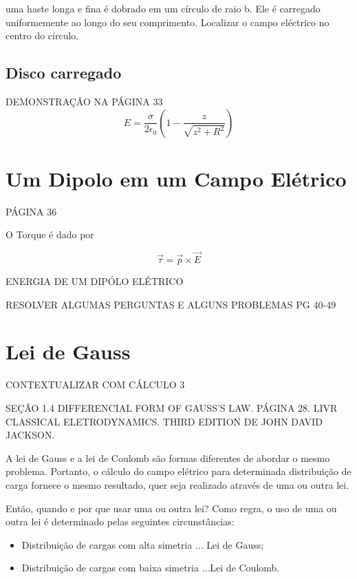 \begin{exe}
uma haste longa e fina é dobrado em um círculo de raio b. Ele é carregado uniformemente ao longo do seu comprimento. Localizar o campo eléctrico no centro do círculo.
\end{exe}

\subsection{Disco carregado}
DEMONSTRAÇÃO NA PÁGINA 33
\begin{equation}\label{18.10}
    E=\dfrac{\sigma}{2\epsilon_0} \left(1-\dfrac{z}{\sqrt{z^2+R^2}}\right)
\end{equation}

\section{Um Dipolo em um Campo Elétrico}
PÁGINA 36

O Torque é dado por

\begin{equation}\label{18.11}
    \vec{\tau}=\vec{p}\times \vec{E}
\end{equation}

ENERGIA DE UM DIPÓLO ELÉTRICO

RESOLVER ALGUMAS PERGUNTAS E ALGUNS PROBLEMAS PG 40-49

\section{Lei de Gauss}
CONTEXTUALIZAR COM CÁLCULO 3

SEÇÃO 1.4 DIFFERENCIAL FORM OF GAUSS'S LAW. PÁGINA 28. LIVR CLASSICAL ELETRODYNAMICS. THIRD EDITION DE JOHN DAVID JACKSON.

A lei de Gauss e a lei de Coulomb são formas diferentes de abordar o mesmo problema. Portanto, o cálculo do campo elétrico para determinada distribuição de carga fornece o mesmo resultado, quer seja realizado através de uma ou outra lei.

Então, quando e por que usar uma ou outra lei? Como regra, o uso de uma ou outra lei é determinado pelas seguintes circunstâncias:
\begin{itemize}
    \item Distribuição de cargas com alta simetria ... Lei de Gauss;
    \item Distribuição de cargas com baixa simetria ...Lei de Coulomb.
\end{itemize}

